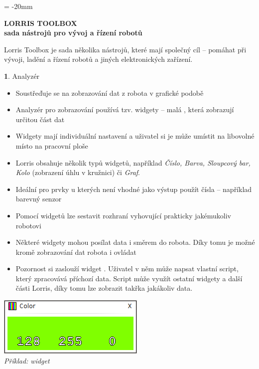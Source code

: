 \documentclass[12pt, a4paper, oneside]{article}
\newcommand{\B}{\textbf} %
\newcommand{\It}{\textit}  %
\begin{document}

\pagestyle{empty} %
 
\voffset = -20mm %
\enlargethispage{60mm} %

\begin{center}
    \Large \B{LORRIS TOOLBOX \\ sada nástrojů pro vývoj a řízení robotů}
\end{center}
\vspace{5mm}
\setlength{\footskip}{0pt}
\setlength{\textheight}{750pt}

Lorris Toolbox je sada několika nástrojů, které mají společný cíl -- pomáhat při vývoji, ladění a řízení robotů a jiných elektronických zařízení.

{\large \B 1. Analyzér }
\begin{itemize}
    \item Soustřeďuje se na zobrazování dat z robota v grafické podobě
    \item Analyzér pro zobrazování používá tzv. widgety -- malá , která zobrazují určitou část dat
    \item Widgety mají individuální nastavení a uživatel si je může umístit na libovolné místo na pracovní ploše
    \item Lorris obsahuje několik typů widgetů, například \It{ Číslo, Barva, Sloupcový bar, Kolo} (zobrazení úhlu v kružnici) či \It{Graf}.
    \item Ideální pro prvky u kterých není vhodné jako výstup použít čísla -- například barevný senzor
    \item Pomocí widgetů lze sestavit rozhraní vyhovující prakticky jakémukoliv robotovi
    \item Některé widgety mohou posílat data i směrem do robota. Díky tomu je možné kromě zobrazování dat robota i ovládat
    \item Pozornost si zaslouží widget . Uživatel v něm může napsat vlastní script, který zpracovává příchozí data. Script může využít ostatní widgety a další části Lorris, díky tomu lze zobrazit takřka jakákoliv data.
\end{itemize}
\begin{center}
\includegraphics{img/color.png} \\
\It{Příklad: widget }
\end{center}
\end{document}
